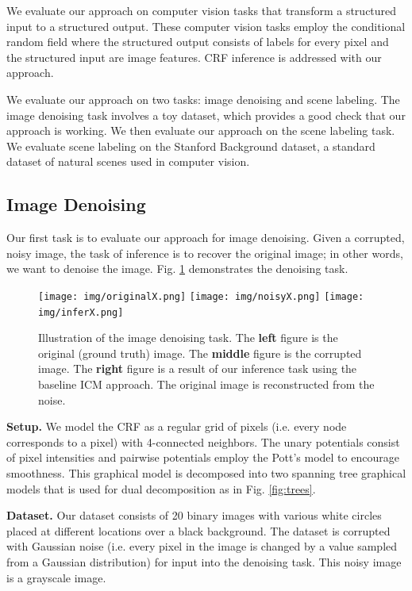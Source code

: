 \documentclass[conference]{IEEEtran}
\begin{document}
We evaluate our approach on computer vision tasks that transform a structured input to a structured output. These computer vision tasks employ the conditional random field where the structured output consists of labels for every pixel and the structured input are image features. CRF inference is addressed with our approach.

We evaluate our approach on two tasks: image denoising and scene labeling. The image denoising task involves a toy dataset, which provides a good check that our approach is working. We then evaluate our approach on the scene labeling task. We evaluate scene labeling on the Stanford Background dataset, a standard dataset of natural scenes used in computer vision.

\subsection{Image Denoising}

Our first task is to evaluate our approach for image denoising. Given a corrupted, noisy image, the task of inference is to recover the original image; in other words, we want to denoise the image. Fig. \ref{fig:denoisingdemo} demonstrates the denoising task.

\begin{figure}
\centering
\texttt{[image: img/originalX.png]}\hfill%
\texttt{[image: img/noisyX.png]}\hfill%
\texttt{[image: img/inferX.png]}
\caption{Illustration of the image denoising task. The {\bf left} figure is the original (ground truth) image. The {\bf middle} figure is the corrupted image. The {\bf right} figure is a result of our inference task using the baseline ICM approach. The original image is reconstructed from the noise.}
\label{fig:denoisingdemo}
\end{figure}

{\bf Setup.} We model the CRF as a regular grid of pixels (i.e. every node corresponds to a pixel) with 4-connected neighbors. The unary potentials consist of pixel intensities and pairwise potentials employ the Pott's model to encourage smoothness. This graphical model is decomposed into two spanning tree graphical models that is used for dual decomposition as in Fig. \ref{fig:trees}.

{\bf Dataset.} Our dataset consists of 20 binary images with various white circles placed at different locations over a black background. The dataset is corrupted with Gaussian noise (i.e. every pixel in the image is changed by a value sampled from a Gaussian distribution) for input into the denoising task. This noisy image is a grayscale image.
\end{document}
